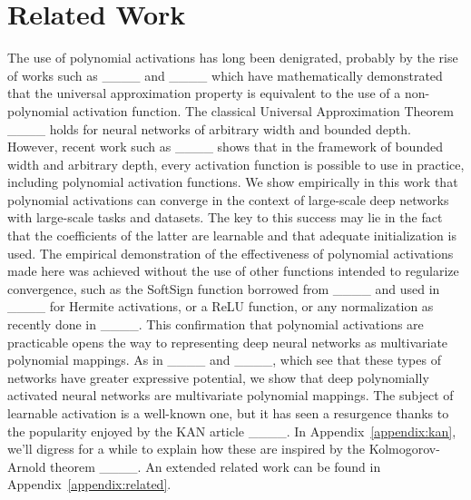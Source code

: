 \section{Related Work}
The use of polynomial activations has long been denigrated, probably by the rise of works such as ____ and ____ which have mathematically demonstrated that the universal approximation property is equivalent to the use of a non-polynomial activation function. The classical Universal Approximation Theorem ____ holds for neural networks of arbitrary width and bounded depth. However, recent work such as ____ shows that in the framework of bounded width and arbitrary depth, every activation function is possible to use in practice, including polynomial activation functions. We show empirically in this work that polynomial activations can converge in the context of large-scale deep networks with large-scale tasks and datasets. The key to this success may lie in the fact that the coefficients of the latter are learnable and that adequate initialization is used.
The empirical demonstration of the effectiveness of polynomial activations made here was achieved without the use of other functions intended to regularize convergence, such as the SoftSign function borrowed from ____ and used in ____ for Hermite activations, or a ReLU function, or any normalization as recently done in ____.
This confirmation that polynomial activations are practicable opens the way to representing deep neural networks as multivariate polynomial mappings. As in ____ and ____, which see that these types of networks have greater expressive potential, we show that deep polynomially activated neural networks are multivariate polynomial mappings.
The subject of learnable activation is a well-known one, but it has seen a resurgence thanks to the popularity enjoyed by the KAN article ____. In Appendix~\ref{appendix:kan}, we'll digress for a while to explain how these are inspired by the Kolmogorov-Arnold theorem ____. An extended  related work can be found in Appendix~\ref{appendix:related}.